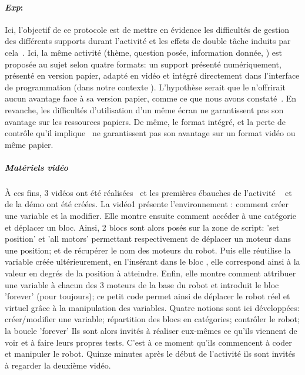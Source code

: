         \paragraph{\textit{Exp}: }\label{Exp:Role_support}
            Ici, l'objectif de ce protocole est de mettre en évidence les difficultés de gestion des différents supports durant l'activité et les effets de double tâche induits par cela~.
            Ici, la même activité (\eg thème, question posée, information donnée, \etc) est proposée au sujet selon quatre formats: \Li un support  présenté numériquement, \ii présenté en version papier, \iii adapté en vidéo et \iiii intégré directement dans l'interface de programmation (dans notre contexte ). L'hypothèse serait que le \Li n'offrirait aucun avantage face à sa version papier, comme ce que nous avons constaté~. En revanche, les difficultés d'utilisation d'un même écran  ne garantissent pas son avantage sur les ressources papiers. De même, le format intégré, et la perte de contrôle qu'il implique~ ne garantissent pas son avantage sur un format vidéo ou même papier.
            \subparagraph{Matériels vidéo}
                À ces fins, 3 vidéos ont été réalisées~ et les premières ébauches de l'activité ~ et de la démo  ont été créées.
                La vidéo1 présente l'environnement : comment créer une variable et la modifier. Elle montre ensuite comment accéder à une catégorie et déplacer un bloc. Ainsi, 2 blocs sont alors posés sur la zone de script: 'set position' et 'all motors' permettant respectivement de déplacer un moteur dans une position; et de récupérer le nom des moteurs du robot. Puis elle réutilise la variable créée ultérieurement, en l'insérant dans le bloc , elle correspond ainsi à la valeur en degrés de la position à atteindre. Enfin, elle montre comment attribuer une variable à chacun des 3 moteurs de la base du robot et introduit le bloc 'forever' (pour toujours); ce petit code permet ainsi de déplacer le robot réel et virtuel grâce à la manipulation des variables. Quatre notions sont ici développées: créer/modifier une variable; répartition des blocs en catégories; contrôler le robot; la boucle 'forever'
                Ils sont alors invités à réaliser eux-mêmes ce qu'ils viennent de voir et à faire leurs propres tests. C'est à ce moment qu'ils commencent à coder et manipuler le robot. Quinze minutes après le début de l'activité ils sont invités à regarder la deuxième vidéo.\par%
